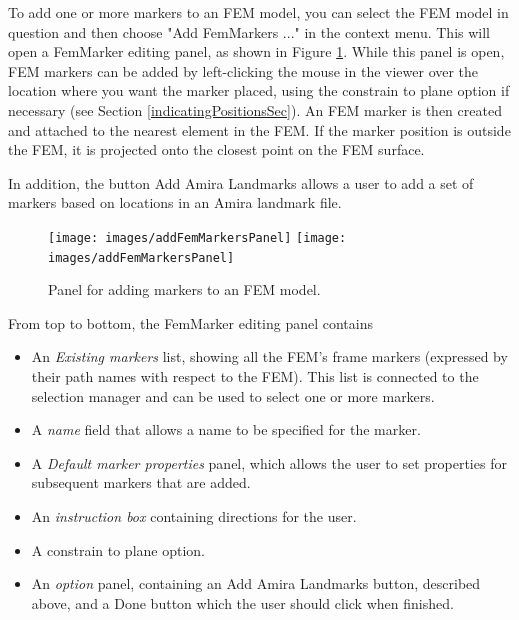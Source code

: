 \documentclass{article}
\begin{document}
To add one or more markers to an FEM model, you can select the FEM
model in question and then choose {\sf "Add FemMarkers ..."} in the context
menu. This will open a FemMarker editing panel, as shown in
Figure \ref{addFemMarkersPanelFig}. While this panel is open, FEM markers can be
added by left-clicking the mouse in the viewer over the location where
you want the marker placed, using the {\sf constrain to plane} option if
necessary (see Section \ref{indicatingPositionsSec}). 
An FEM marker is then created
and attached to the nearest element in the FEM. If the marker position
is outside the FEM, it is projected onto the closest point on the FEM
surface.

In addition, the button {\sf Add Amira Landmarks} allows a user to add a
set of markers based on locations in an Amira landmark file.

\begin{figure}
\begin{center}
\iflatexml
\texttt{[image: images/addFemMarkersPanel]}
\else
\texttt{[image: images/addFemMarkersPanel]}
\fi
\end{center}
\caption{Panel for adding markers to an FEM model.}%
\label{addFemMarkersPanelFig}
\end{figure}

From top to bottom, the FemMarker editing panel contains

\begin{itemize}

\item An {\it Existing markers} list, showing all the FEM's frame
markers (expressed by their path names with respect to the
FEM). This list is connected to the selection manager and can be
used to select one or more markers.

\item A {\it name} field that allows a name to be specified for the marker.

\item A {\it Default marker properties} panel, which
allows the user to set properties for subsequent markers that are added.

\item An {\it instruction box} containing directions for the user.

\item A {\sf constrain to plane} option.

\item An {\it option} panel, containing an {\sf Add Amira Landmarks} button,
described above, and a {\sf Done} button which
the user should click when finished.

\end{itemize}
\end{document}
